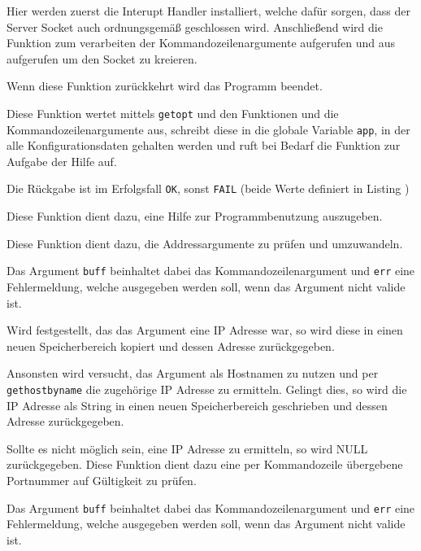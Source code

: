 Hier werden zuerst die Interupt Handler installiert, welche daf\"{u}r sorgen, dass der Server Socket auch ordnungsgem\"{a}ß geschlossen wird. Anschließend wird die Funktion  zum verarbeiten der Kommandozeilenargumente aufgerufen und  aus  aufgerufen um den Socket zu kreieren.

Wenn diese Funktion zur\"{u}ckkehrt wird das Programm beendet.

\label{fn:process_opt}
Diese Funktion wertet mittels \texttt{getopt} und den Funktionen  und  die Kommandozeilenargumente aus, schreibt diese in die globale Variable \texttt{app}, in der alle Konfigurationsdaten gehalten werden und ruft bei Bedarf die Funktion zur Aufgabe der Hilfe  auf.

Die R\"{u}ckgabe ist im Erfolgsfall \texttt{OK}, sonst \texttt{FAIL} (beide Werte definiert in Listing )

\label{fn:write_help}
Diese Funktion dient dazu, eine Hilfe zur Programmbenutzung auszugeben.

\label{fn:host_opt}
Diese Funktion dient dazu, die Addressargumente zu pr\"{u}fen und umzuwandeln.

Das Argument \texttt{buff} beinhaltet dabei das Kommandozeilenargument und \texttt{err} eine Fehlermeldung, welche ausgegeben werden soll, wenn das Argument nicht valide ist.

Wird festgestellt, das das Argument eine IP Adresse war, so wird diese in einen neuen Speicherbereich kopiert und dessen Adresse zur\"{u}ckgegeben.

Ansonsten wird versucht, das Argument als Hostnamen zu nutzen und per \texttt{gethostbyname} die zugeh\"{o}rige IP Adresse zu ermitteln. Gelingt dies, so wird die IP Adresse als String in einen neuen Speicherbereich geschrieben und dessen Adresse zur\"{u}ckgegeben.

Sollte es nicht m\"{o}glich sein, eine IP Adresse zu ermitteln, so wird NULL zur\"{u}ckgegeben.
\label{fn:port_opt}
Diese Funktion dient dazu eine per Kommandozeile \"{u}bergebene Portnummer auf G\"{u}ltigkeit zu pr\"{u}fen.

Das Argument \texttt{buff} beinhaltet dabei das Kommandozeilenargument und \texttt{err} eine Fehlermeldung, welche ausgegeben werden soll, wenn das Argument nicht valide ist.

